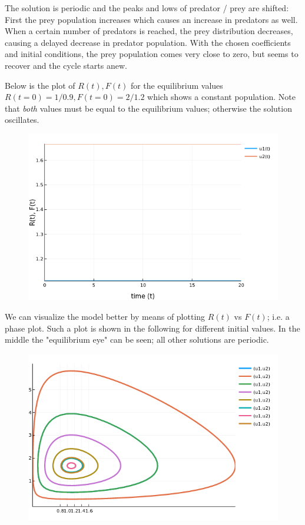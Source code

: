 The solution is periodic and the peaks and lows of predator / prey are shifted: First the prey population increases which causes an increase in predators as well. When a certain number of predators is reached, the prey distribution decreases, causing a delayed decrease in predator population. With the chosen coefficients and initial conditions, the prey population comes very close to zero, but seems to recover and the cycle starts anew.

Below is the plot of $R(t), F(t)$ for the equilibrium values $R(t=0) = 1/0.9, F(t=0) = 2/1.2$ which shows a constant population. Note that \emph{both} values must be equal to the equilibrium values; otherwise the solution oscillates.

\begin{figure}[H]
	\includegraphics[scale=0.65]{images/ode_04_02.png}
\end{figure}

We can visualize the model better by means of plotting $R(t)$ vs $F(t)$; i.e. a phase plot. Such a plot is shown in the following for different initial values. In the middle the "equilibrium eye" can be seen; all other solutions are periodic.

\begin{figure}[H]
	\includegraphics[scale=0.65]{images/ode_04_03.png}
\end{figure}


